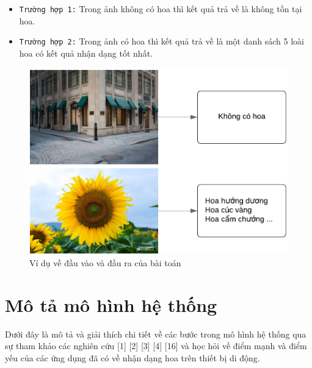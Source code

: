 \documentclass[12pt]{report}
\begin{document}
		\begin{itemize}
			\item \texttt{Trường hợp 1:} Trong ảnh không có hoa thì kết quả trả về là không tồn tại hoa.
			\item \texttt{Trường hợp 2:} Trong ảnh có hoa thì kết quả trả về là một danh sách 5 loài hoa có kết quả nhận dạng tốt nhất.
		\end{itemize}
		\begin{figure}[h]
			\centering
			\includegraphics[scale=0.4]{mota_baitoan}
			\caption{Ví dụ về đầu vào và đầu ra của bài toán}
			\label{fig:mota_baitoan}
		\end{figure}
										
		\section{Mô tả mô hình hệ thống}
		Dưới đây là mô tả và giải thích chi tiết về các bước trong mô hình hệ thống qua sự tham khảo các nghiên cứu [1] [2] [3] [4] [16] và học hỏi về điểm mạnh và điểm yếu của các ứng dụng đã có về nhận dạng hoa trên thiết bị di động.
										
\end{document}
